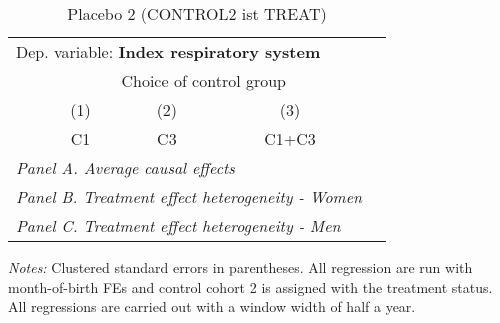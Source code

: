  \begin{table}[H] \centering \begin{threeparttable} \caption{Placebo 2 (CONTROL2 ist TREAT) } {\def\sym#1{\ifmmode^{#1}\else\(^{#1}\)\fi} \begin{tabular}{l*{4}{c}} \toprule \multicolumn{4}{l}{Dep. variable: \textbf{Index respiratory system}} \\ & \multicolumn{3}{c}{Choice of control group} \\ \cmidrule(lr){2-4}
            &\multicolumn{1}{c}{(1)}&\multicolumn{1}{c}{(2)}&\multicolumn{1}{c}{(3)}\\
            &\multicolumn{1}{c}{C1}&\multicolumn{1}{c}{C3}&\multicolumn{1}{c}{C1+C3}\\
\midrule
 \multicolumn{4}{l}{\emph{Panel A. Average causal effects}} \\      \midrule\multicolumn{4}{l}{\emph{Panel B. Treatment effect heterogeneity - Women}} \\      \midrule\multicolumn{4}{l}{\emph{Panel C. Treatment effect heterogeneity - Men}} \\      
\bottomrule \end{tabular} } \begin{tablenotes} \item \scriptsize \emph{Notes:} Clustered standard errors in parentheses. All regression are run with month-of-birth FEs and control cohort 2 is assigned with the treatment status. All regressions are carried out with a window width of half a year. \end{tablenotes} \end{threeparttable} \end{table} 
